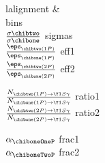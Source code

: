 \begin{tabu}{l{{alignment}}}
&  \\
{{bins}} \\
\hline
$\frac{\sigma{\chibtwo}}{\sigma{\chibone}}$ {{sigmas}} \\

$\frac{\eps_{\chibtwo(1P)}}{\eps_{\chibone(1P)}}$ {{eff1}} \\
$\frac{\eps_{\chibtwo(2P)}}{\eps_{\chibone(2P)}}$ {{eff2}} \\


\rule{0pt}{4ex}$\frac{N_{\chibtwo(1P) \rightarrow \Y1S \gamma}}{N_{\chibone(1P) \rightarrow \Y1S \gamma}}$ {{ratio1}} \\

$\frac{N_{\chibtwo(2P) \rightarrow \Y1S \gamma}}{N_{\chibone(2P) \rightarrow \Y1S \gamma}}$ {{ratio2}} \\

\rule{0pt}{4ex}$\alpha_{\chiboneOneP}$ {{frac1}} \\
$\alpha_{\chiboneTwoP}$ {{frac2}} \\
\end{tabu}